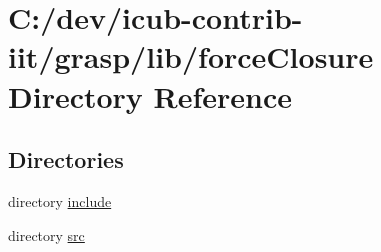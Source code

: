 \section{C\+:/dev/icub-\/contrib-\/iit/grasp/lib/force\+Closure Directory Reference}
\label{dir_f0d07e9781124531f6a334c59340410c}
\subsection*{Directories}
\begin{DoxyCompactItemize}
\item 
directory \hyperlink{dir_dd2f03498fece1ec03c5d64bf7e4ae95}{include}
\item 
directory \hyperlink{dir_7ec6ad8298c4de138f67cf24a0dea868}{src}
\end{DoxyCompactItemize}
